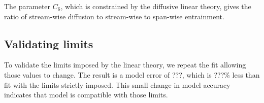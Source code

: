 The parameter $C_6$, which is constrained by the diffusive linear theory, gives the ratio of stream-wise diffusion to stream-wise to span-wise entrainment.

\subsection{Validating limits}
To validate the limits imposed by the linear theory, we repeat the fit allowing those values to change.
The result is a model error of ???, which is ???\% less than fit with the limits strictly imposed.
This small change in model accuracy indicates that model is compatible with those limits.


